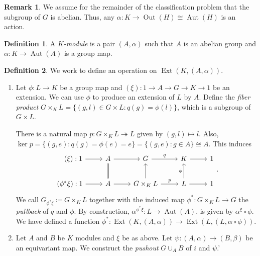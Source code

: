 \documentclass[10pt,letterpaper,cm]{nupset}
\theoremstyle{definition}
\newtheorem*{definition}{Definition}
\newtheorem{remark}{Remark}
\newcommand{\1}{\mathbf{1}}
\newcommand{\0}{\vec 0}
\DeclareMathOperator{\aut}{Aut}
\DeclareMathOperator{\ext}{Ext}
\DeclareMathOperator{\out}{Out}
\begin{document}
\begin{remark}
We assume for the remainder of the classification problem that the subgroup of $G$ is abelian. Thus, any $\alpha : K \to \out(H)\cong \aut(H)$ is an action.
\end{remark}

\begin{definition}
A \textit{$K$-module} is a pair $(A, \alpha)$ such that $A$ is an abelian group and $\alpha : K \to \aut(A)$ is a group map.
\end{definition}

\begin{definition} We work to define an operation on $\ext(K, (A, \alpha))$.
\begin{enumerate}
\item Let $\phi  : L \to K$ be a group map and $(\xi) : 1 \to A \to G \to K \to 1$ be an extension. We can use $\phi$ to produce an extension of $L$ by $A$. Define the \textit{fiber product} $G \times_K L = \{(g, l) \in G \times L : q(g) = \phi(l)\}$, which is a subgroup of $G \times L$.

There is a natural map $p: G\times_K L \twoheadrightarrow L$ given by $(g, l) \mapsto l$. Also, $\ker p = \{(g, e) : q(g) = \phi(e) =e \} = \{(g, e) : g \in A\} \cong A$. This induces
\[
\begin{tikzcd}
\quad (\xi): 1 \arrow[r] & A \arrow[r] & G \arrow[r, "q"] & K \arrow[r] & 1 \\
(\phi^{\ast}\xi): 1 \arrow[r] & A \arrow[r] \arrow[u, equal] & G\times_K L \arrow[r, "p"] \arrow[u] & L \arrow[u, "\phi"] \arrow[r] & 1
\end{tikzcd}.
\]
We call $G_{\phi^{\ast}\xi}\coloneqq  G\times_{K}L$ together with the induced map $\phi^{\ast} : G\times_{K}L\to G$ the \textit{pullback} of $q$ and $\phi$.  By construction, $\alpha^{\phi^{\ast}\xi} : L \to \aut(A)$. is given by $\alpha^{\xi} \circ \phi$. We have defined a function $\phi^{\ast} : \ext(K, (A, \alpha)) \to \ext(L, (L, \alpha \circ \phi))$. 

\item Let $A$ and $B$ be $K$ modules and $\xi$ be as above. Let $\psi: (A, \alpha) \to (B, \beta)$ be an equivariant map. We construct the \textit{pushout} $G \cup_A B$ of $i$ and $\psi$.'


\end{enumerate}
\end{definition}
\end{document}
